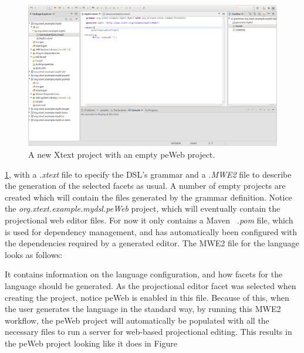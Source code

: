 \documentclass{article}
\begin{document}
\begin{figure}[h!]
  \includegraphics[width=\linewidth]{./Screenshots/newProjectScreen.png}
  \caption{A new Xtext project with an empty peWeb project.}
  \label{fig:newProjectScreen}
\end{figure} \ref{fig:newProjectScreen}, with a \emph{.xtext} file to specify the DSL's grammar and a \emph{.MWE2} file to describe the generation of the selected facets as usual. A number of empty projects are created which will contain the files generated by the grammar definition. Notice the \emph{org.xtext.example.mydsl.peWeb} project, which will eventually contain the projectional web editor files. For now it only contains a Maven~\cite{maven} \emph{.pom} file, which is used for dependency management, and has automatically been configured with the dependencies required by a generated editor.
\clearpage
\noindent The MWE2 file for the language looks as follows:

It contains information on the language configuration, and how facets for the language should be generated. As the projectional editor facet was selected when creating the project, notice peWeb is enabled in this file. Because of this, when the user generates the language in the standard way, by running this MWE2 workflow, the peWeb project will automatically be populated with all the necessary files to run a server for web-based projectional editing. This results in the peWeb project looking like it does in Figure 
\end{document}
